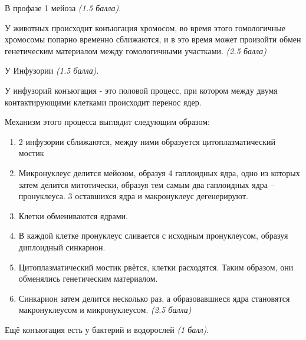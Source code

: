 \solutionSection
В профазе 1 мейоза \textit{(1.5 балла)}.

У животных происходит конъюгация хромосом, во время этого гомологичные хромосомы попарно временно сближаются, и в это время может произойти обмен генетическим материалом между гомологичными участками. \textit{(2.5 балла)}

У Инфузории \textit{(1.5 балла)}.

У инфузорий конъюгация - это половой процесс, при котором между двумя контактирующими клетками происходит перенос ядер.

Механизм этого процесса выглядит следующим образом:

\begin{enumerate}
\item 2 инфузории сближаются, между ними образуется цитоплазматический мостик
\item Микронуклеус делится мейозом, образуя 4 гаплоидных ядра, одно из которых затем делится митотически, образуя тем самым два гаплоидных ядра – пронуклеуса. 3 оставшихся ядра и макронуклеус дегенерируют.
\item Клетки обмениваются ядрами.
\item В каждой клетке пронуклеус сливается с исходным пронуклеусом, образуя диплоидный синкарион.
\item Цитоплазматический мостик рвётся, клетки расходятся. Таким образом, они обменялись генетическим материалом.
\item Синкарион затем делится несколько раз, а образовавшиеся ядра становятся макронуклеусом и микронуклеусом. \textit{(2.5 балла)}
\end{enumerate}
Ещё конъюгация есть у бактерий и водорослей \textit{(1 балл)}.